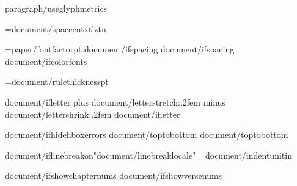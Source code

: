 \def\LineSpaceBase{{{paragraph/linespacebase}}}
\def\LineSpacingFactor{{{paragraph/linespacingfactor}}}
\def\VerticalSpaceFactor{{1.0}}
{paragraph/useglyphmetrics}

\XeTeXinterwordspaceshaping={document/spacecntxtlztn}

\FontSizeUnit={paper/fontfactor}pt
\def\regular{{"{document/fontregular}{document/script}"}}
\def\bold{{"{document/fontbold}{document/script}"}}
\def\italic{{"{document/fontitalic}{document/script}"}}
\def\bolditalic{{"{document/fontbolditalic}{document/script}"}}
{document/ifspacing}\def\SpaceStretchFactor{{{document/spacestretch}}}
{document/ifspacing}\def\SpaceShrinkFactor{{{document/spaceshrink}}}
{document/ifcolorfonts}\ColorFontsfalse

\def\UnderlineThickness{{{document/underlinethickness}em}}
\def\UnderlineLower{{{document/underlineposition}em}}
\RuleThickness={document/rulethickness}pt


{document/ifletter}\newskip\intercharskip \intercharskip=0pt plus {document/letterstretch:.2f}em minus {document/lettershrink:.2f}em
{document/ifletter}\def\intercharspace{{\leavevmode\nobreak\hskip\intercharskip}}

{document/ifhidehboxerrors}\overfullrule=0pt
{document/toptobottom}     %
{document/toptobottom}\rotatetrue

{document/iflinebreakon}\XeTeXlinebreaklocale "{document/linebreaklocale}"
\IndentUnit={document/indentunit}in

{document/ifshowchapternums}\OmitChapterNumbertrue
\def\AfterChapterSpaceFactor{{{document/afterchapterspace}}}
{document/ifshowversenums}\def\AfterVerseSpaceFactor{{{document/afterversespace}}}

